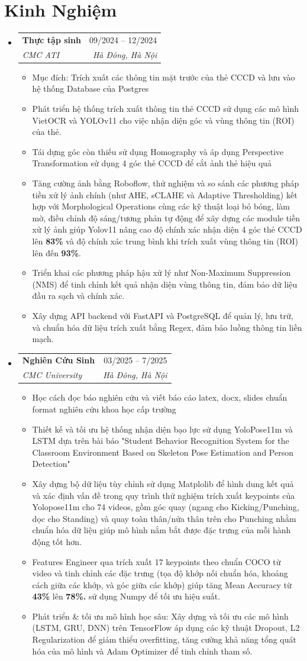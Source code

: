 \documentclass[letterpaper,11pt]{article}
\makeatletter
\newcommand{\resumeItem}[1]{
	\item\small{
	{#1 \vspace{-2pt}}
	}
}
\newcommand{\resumeSubheading}[4]{
	\vspace{-2pt}\item
	\begin{tabular*}{0.97\textwidth}[t]{l@{\extracolsep{\fill}}r}
		\textbf{#1} & #2 \\
		\textit{\small#3} & \textit{\small #4} \\
	\end{tabular*}\vspace{-7pt}
}
\newcommand{\resumeSubHeadingListStart}{\begin{itemize}[leftmargin=0.15in, label={}]}
\newcommand{\resumeSubHeadingListEnd}{\end{itemize}}
\newcommand{\resumeItemListStart}{\begin{itemize}}
\newcommand{\resumeItemListEnd}{\end{itemize}\vspace{-5pt}}
\makeatother
\begin{document}
\section{Kinh Nghiệm}
	\resumeSubHeadingListStart
		\resumeSubheading
			{Thực tập sinh} {09/2024 -- 12/2024 }
			{CMC ATI} {Hà Đông, Hà Nội}
			\resumeItemListStart
			\resumeItem{Mục đích: Trích xuất các thông tin mặt trước của thẻ CCCD và lưu vào hệ thống Database của Postgres}
			\resumeItem{Phát triển hệ thống trích xuất thông tin thẻ CCCD sử dụng các mô hình VietOCR và YOLOv11 cho việc nhận diện góc và vùng thông tin (ROI) của thẻ.}
			\resumeItem{Tái dựng góc còn thiếu sử dụng Homography và áp dụng Perspective Transformation sử dụng 4 góc thẻ CCCD để cắt ảnh thẻ hiệu quả}
			\resumeItem{Tăng cường ảnh bằng Roboflow, thử nghiệm và so sánh các phương pháp tiền xử lý ảnh chính (như AHE, sCLAHE và Adaptive Thresholding) kết hợp với Morphological Operations cùng các kỹ thuật loại bỏ bóng, làm mờ, điều chỉnh độ sáng/tương phản tự động để xây dựng các module tiền xử lý ảnh giúp Yolov11 nâng cao độ chính xác nhận diện 4 góc thẻ CCCD lên \textbf{83\%} và độ chính xác trung bình khi trích xuất vùng thông tin (ROI) lên đến \textbf{93\%}.}
			\resumeItem{Triển khai các phương pháp hậu xử lý như Non-Maximum Suppression (NMS) để tinh chỉnh kết quả nhận diện vùng thông tin, đảm bảo dữ liệu đầu ra sạch và chính xác.}
			\resumeItem{Xây dựng API backend với FastAPI và PostgreSQL để quản lý, lưu trữ, và chuẩn hóa dữ liệu trích xuất bằng Regex, đảm bảo luồng thông tin liền mạch.}
			\resumeItemListEnd

		\resumeSubheading
			{Nghiên Cứu Sinh} {03/2025 -- 7/2025} %
			{CMC University} {Hà Đông, Hà Nội}
			\resumeItemListStart
			\resumeItem{Học cách đọc báo nghiên cứu và viết báo cáo latex, docx, slides chuẩn format nghiên cứu khoa học cấp trường}
			\resumeItem{Thiết kế và tối ưu hệ thống nhận diện bạo lực sử dụng YoloPose11m và LSTM dựa trên bài báo "Student Behavior Recognition System for the Classroom Environment Based on Skeleton Pose Estimation and Person Detection"}
			\resumeItem{Xây dựng bộ dữ liệu tùy chỉnh sử dụng Matplolib để hình dung kết quả và xác định vấn đề trong quy trình thử nghiệm trích xuất keypoints của Yolopose11m cho 74 videos, gồm góc quay (ngang cho Kicking/Punching, dọc cho Standing) và quay toàn thân/nửa thân trên cho Punching nhằm chuẩn hóa dữ liệu giúp mô hình nắm bắt được đặc trưng của mỗi hành động tốt hơn.}
			\resumeItem{Features Engineer qua trích xuất 17 keypoints theo chuẩn COCO  từ video và tinh chỉnh các đặc trưng (tọa độ khớp nối chuẩn hóa, khoảng cách giữa các khớp, và góc giữa các khớp) giúp tăng Mean Accuracy từ \textbf{43\%} lên \textbf{78\%.}  sử dụng Numpy để tối ưu hiệu suất.}
			\resumeItem{Phát triển \& tối ưu mô hình học sâu: Xây dựng và tối ưu các mô hình (LSTM, GRU, DNN) trên TensorFlow áp dụng các kỹ thuật Dropout, L2 Regularization để giảm thiểu overfitting, tăng cường khả năng tổng quát hóa của mô hình và Adam Optimizer để tinh chỉnh tham số.}
			\resumeItemListEnd
	\resumeSubHeadingListEnd
\end{document}
